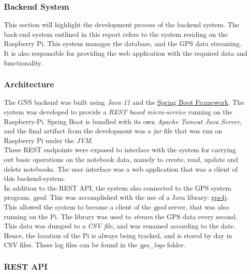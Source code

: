 
\subsubsection*{Backend System}
This section will highlight the development process of the backend system. The back-end system outlined in this report refers to the system residing on the Raspberry Pi. This system manages the database, and the GPS data streaming. It is also responsible for providing the web application with the required data and functionality.\\

\subsubsection*{Architecture}
The GNS backend was built using \textit{Java 11} and the \href{https://spring.io}{Spring Boot Framework}. The system was developed to provide a \textit{REST based micro-service} running on the Raspberry-Pi. Spring Boot is bundled with its own \textit{Apache Tomcat Java Server}, and the final artifact from the development was a \textit{jar} file that was run on Raspberry Pi under the \textit{JVM}.\\

These REST endpoints were exposed to interface with the system for carrying out basic operations on the notebook data, namely to create, read, update and delete notebooks. The user interface was a web application that was a client of this backend-system.\\

In addition to the REST API, the system also connected to the GPS system program, \textit{gpsd}. This was accomplished with the use of a Java library: \href{https://github.com/ivkos/gpsd4j}{gps4j}.\\

This allowed the system to become a client of the \textit{gpsd} server, that was also running on the Pi. The library was used to \textit{stream} the GPS data every second. This data was dumped to a \textit{CSV file}, and was renamed according to the date. Hence, the location of the Pi is always being tracked, and is stored by day in CSV files. These log files can be found in the \textit{gps\_logs} folder.\\

\subsubsection*{REST API}

